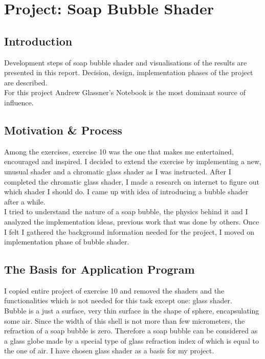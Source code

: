 \chapter{Project: Soap Bubble Shader}
\label{cha:proj-udvid-af}


\section{Introduction}
\label{sec:proj-intro}

Development steps of soap bubble shader and visualisations of the results are presented in this report. Decision, design, implementation phases of the project are described. \\

For this project Andrew Glassner's Notebook \cite{Glassner:1999:AGN:318952} is the most dominant source of influence. 



\section{Motivation \& Process}
\label{sec:proj-motiv}
Among the exercises, exercise 10 was the one that makes me entertained, encouraged and inspired. I decided to extend the exercise by implementing a new, unusual shader and a chromatic glass shader as I was instructed. After I completed the chromatic glass shader, I made a research on internet to figure out which shader I should do. I came up with idea of introducing a bubble shader after a while.\\
I tried to understand the nature of a soap bubble, the physics behind it and I analyzed the implementation ideas, previous work that was done by others. Once I felt I gathered the background information needed for the project, I moved on implementation phase of bubble shader.


\section{The Basis for Application Program}
\label{sec:proj-basis}
I copied entire project of exercise 10 and removed the shaders and the functionalities which is not needed for this task except one: glass shader.\\
Bubble is a just a surface, very thin surface in the shape of sphere, encapsulating some air. Since the width of this shell is not more than few micrometers, the refraction of a soap bubble is zero. Therefore a soap bubble can be considered as a glass globe made by a special type of glass refraction index of which is equal to the one of air. I have chosen glass shader as a basis for my project.\\


